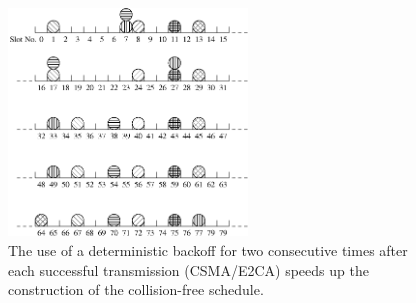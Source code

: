 \documentclass[journal]{IEEEtran}
\begin{document}

\begin{figure}[!t]
\centering
\includegraphics[width=2.5in]{figures/csma_e2ca}
\caption{The use of a deterministic backoff for two consecutive times after each successful transmission (CSMA/E2CA) speeds up the construction of the collision-free schedule.}
\label{fig:csma_e2ca}
\end{figure}


\end{document}

